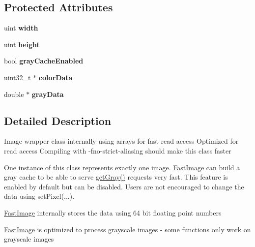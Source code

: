 \subsection*{Protected Attributes}
\begin{DoxyCompactItemize}
\item 
\hypertarget{class_fast_image_ae8bc71fe6069de24a12214fc3828ca6d}{
uint {\bfseries width}}
\label{class_fast_image_ae8bc71fe6069de24a12214fc3828ca6d}

\item 
\hypertarget{class_fast_image_aca3f4d119be3052564a7b95645e416ae}{
uint {\bfseries height}}
\label{class_fast_image_aca3f4d119be3052564a7b95645e416ae}

\item 
\hypertarget{class_fast_image_aced6ae3b9e826ed23b1e35e0556b9e0e}{
bool {\bfseries grayCacheEnabled}}
\label{class_fast_image_aced6ae3b9e826ed23b1e35e0556b9e0e}

\item 
\hypertarget{class_fast_image_a1694943fbf3cd250f629c70c07d89e6e}{
uint32\_\-t $\ast$ {\bfseries colorData}}
\label{class_fast_image_a1694943fbf3cd250f629c70c07d89e6e}

\item 
\hypertarget{class_fast_image_ab0eae6bc0937543738d336a9b4f1a68c}{
double $\ast$ {\bfseries grayData}}
\label{class_fast_image_ab0eae6bc0937543738d336a9b4f1a68c}

\end{DoxyCompactItemize}


\subsection{Detailed Description}
Image wrapper class internally using arrays for fast read access Optimized for read access Compiling with -\/fno-\/strict-\/aliasing should make this class faster

One instance of this class represents exactly one image. \hyperlink{class_fast_image}{FastImage} can build a gray cache to be able to serve \hyperlink{class_fast_image_a7da37f6c5c99feea80c6a699c7b51bd8}{getGray()} requests very fast. This feature is enabled by default but can be disabled. Users are not encouraged to change the data using setPixel(...).

\hyperlink{class_fast_image}{FastImage} internally stores the data using 64 bit floating point numbers

\hyperlink{class_fast_image}{FastImage} is optimized to process grayscale images -\/ some functions only work on grayscale images

